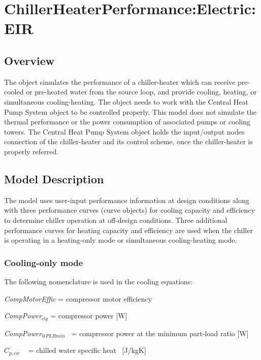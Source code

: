\section{ChillerHeaterPerformance:Electric:EIR }\label{chillerheaterperformanceelectriceir}

\subsection{Overview}\label{overview-008}

The object simulates the performance of a chiller-heater which can receive pre-cooled or pre-heated water from the source loop, and provide cooling, heating, or simultaneous cooling-heating. The object needs to work with the Central Heat Pump System object to be controlled properly. This model does not simulate the thermal performance or the power consumption of associated pumps or cooling towers. The Central Heat Pump System object holds the input/output nodes connection of the chiller-heater and its control scheme, once the chiller-heater is properly referred.

\subsection{Model Description}\label{model-description-005}

The model uses user-input performance information at design conditions along with three performance curves (curve objects) for cooling capacity and efficiency to determine chiller operation at off-design conditions. Three additional performance curves for heating capacity and efficiency are used when the chiller is operating in a heating-only mode or simultaneous cooling-heating mode.

\subsubsection{Cooling-only mode}\label{cooling-only-mode}

The following nomenclature is used in the cooling equations:

\emph{CompMotorEffic} = compressor motor efficiency

\emph{CompPower\(_{clg}\)} = compressor power {[}W{]}

\emph{CompPower\(_{@PLRmin}\)}~ = compressor power at the minimum part-load ratio {[}W{]}

\({C_{p,cw}}\) ~ = chilled water specific heat~ {[}J/kgK{]}

